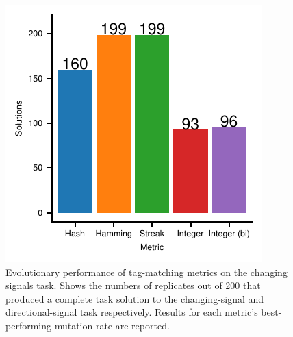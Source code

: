 \begin{figure}[!htbp]
\centering
\includegraphics[width=0.75\linewidth]{img/gp_results/panel-cst-sols.pdf}

\caption{
Evolutionary performance of tag-matching metrics on the changing signals task.
Shows the numbers of replicates out of 200 that produced a complete task solution to the changing-signal and directional-signal task respectively.
Results for each metric's best-performing mutation rate are reported.
}

\label{fig:cst-sols}

\end{figure}
